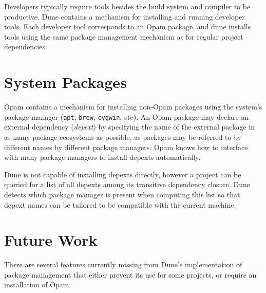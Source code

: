 \documentclass{article}
\begin{document}
\begin{multicols}{2}
        Developers typically require tools besides the build system and compiler
        to be productive. Dune contains a mechanism for installing and running
        developer tools. Each developer tool corresponds to an Opam package, and
        dune installs tools using the same package management mechanism as for
        regular project dependencies.

        \section {System Packages}

        Opam contains a mechanism for installing non-Opam packages using the
        system's package manager (\texttt{apt}, \texttt{brew}, \texttt{cygwin},
        etc). An Opam package may declare an external dependency
        (\textit{depext}) by specifying the name of the external package in as
        many package ecosystems as possible, as packages may be referred to by
        different names by different package managers. Opam knows how to
        interface with many package managers to install depexts automatically.

        Dune is not capable of installing depexts directly, however a project
        can be queried for a list of all depexts among its transitive dependency
        closure. Dune detects which package manager is present when computing
        this list so that depext names can be tailored to be compatible with
        the current machine.

        \section {Future Work}

        There are several features currently missing from Dune's implementation
        of package management that either prevent its use for some projects, or
        require an installation of Opam:


\end{multicols}
\end{document}
